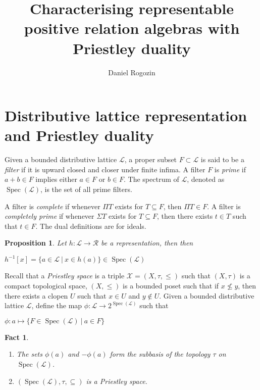 \documentclass[a4paper]{article}
\author{Daniel Rogozin}
\date{}
\title{Characterising representable positive relation algebras with Priestley duality}
\theoremstyle{defin}
\theoremstyle{theorem}
\theoremstyle{claim}
\theoremstyle{prop}
\newtheorem{prop}{Proposition}
\theoremstyle{lemma}
\theoremstyle{fact}
\newtheorem{fact}{Fact}
\theoremstyle{ex}
\theoremstyle{col}
\begin{document}
\maketitle

\nocite{*}

\section{Distributive lattice representation and Priestley duality}

Given a bounded distributive lattice $\mathcal{L}$, a proper subset $F \subset \mathcal{L}$ is said to be a \emph{filter} if it is upward closed and closer under finite infima. A filter $F$ is \emph{prime} if $a + b \in F$ implies either $a \in F$ or $b \in F$. The spectrum of $\mathcal{L}$, denoted as $\operatorname{Spec}(\mathcal{L})$, is the set of all prime filters.

A filter is \emph{complete} if whenever $\Pi T$ exists for $T \subseteq F$, then $\Pi T \in F$. A filter is \emph{completely prime} if whenever $\Sigma T$ exists for $T \subseteq F$, then there exists $t \in T$ such that $t \in F$. The dual definitions are for ideals.

\begin{prop}
Let $h : \mathcal{L} \to \mathcal{R}$ be a representation, then then
\begin{center}
$h^{-1}[x] = \{ a \in \mathcal{L} \: | \: x \in h(a) \} \in \operatorname{Spec}(\mathcal{L})$
\end{center}
\end{prop}

Recall that a \emph{Priestley space} is a triple $\mathcal{X} = (X, \tau, \leq)$ such that $(X, \tau)$ is a compact topological space, $(X, \leq)$ is a bounded poset such that if $x \not\leq y$, then there exists a clopen $U$ such that $x \in U$ and $y \notin U$. Given a bounded distributive lattice $\mathcal{L}$, define the map $\phi : \mathcal{L} \to 2^{\operatorname{Spec}(\mathcal{L})}$ such that
\begin{center}
$\phi : a \mapsto \{ F \in \operatorname{Spec}(\mathcal{L}) \: | \: a \in F \}$
\end{center}

\begin{fact}

$ $

\begin{enumerate}
\item The sets $\phi(a)$ and $- \phi(a)$ form the subbasis of the topology $\tau$ on $\operatorname{Spec}(\mathcal{L})$.
\item $(\operatorname{Spec}(\mathcal{L}), \tau, \subseteq)$ is a Priestley space.
\end{enumerate}
\end{fact}
\end{document}
